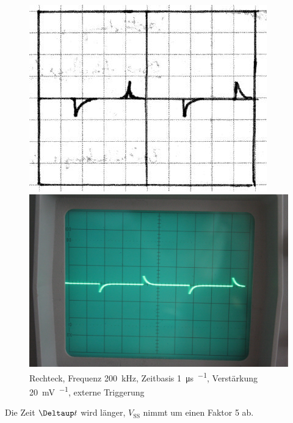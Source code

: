 \begin{figure}
	\centering
	\begin{minipage}{.45\linewidth}
	\includegraphics[width=\linewidth]{Skizzen/IMG_0755-1500.jpg}
	\end{minipage}
	\hfill
	\begin{minipage}{.45\linewidth}
	\includegraphics[width=\linewidth]{Fotos/IMG_0755-1500.jpg}
	\end{minipage}
	\caption{%
		Rechteck, Frequenz \SI{200}{\kilo\hertz}, Zeitbasis \SI{1}{\micro\second\per\division}, Verstärkung \SI{20}{\milli\volt\per\division}, externe Triggerung
	}
	\label{fig:0755}
\end{figure}

Die Zeit $\Deltaup t$ wird länger, $V_\text{SS}$ nimmt um einen Faktor 5 ab.

